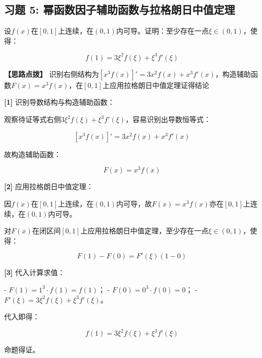 \documentclass[11pt,a4paper,UTF8]{ctexart}
\begin{document}
\subsection{习题 5: 幂函数因子辅助函数与拉格朗日中值定理}

设$f(x)$在$[0, 1]$上连续，在$(0, 1)$内可导。证明：至少存在一点$\xi \in (0, 1)$，使得：


\begin{equation*}
f(1) = 3\xi^2 f(\xi) + \xi^3 f'(\xi)
\end{equation*}

\textbf{\color{DeepPurple}【思路点拨】} 识别右侧结构为$[x^3 f(x)]' = 3x^2 f(x) + x^3 f'(x)$，构造辅助函数$F(x) = x^3 f(x)$，在$[0, 1]$上应用拉格朗日中值定理证得结论


\begin{solbox}[分步推导与答题规范]
\textbf{[1]} 识别导数结构与构造辅助函数：

观察待证等式右侧$3\xi^2 f(\xi) + \xi^3 f'(\xi)$，容易识别出导数恒等式：


\begin{equation*}
\left[x^3 f(x)\right]' = 3x^2 f(x) + x^3 f'(x)
\end{equation*}


故构造辅助函数：


\begin{equation*}
F(x) = x^3 f(x)
\end{equation*}


\textbf{[2]} 应用拉格朗日中值定理：

因$f(x)$在$[0, 1]$上连续，在$(0, 1)$内可导，故$F(x) = x^3 f(x)$亦在$[0, 1]$上连续，在$(0, 1)$内可导。

对$F(x)$在闭区间$[0, 1]$上应用拉格朗日中值定理，至少存在一点$\xi \in (0, 1)$，使得：


\begin{equation*}
F(1) - F(0) = F'(\xi)(1 - 0)
\end{equation*}


\textbf{[3]} 代入计算求值：

- $F(1) = 1^3 \cdot f(1) = f(1)$；
- $F(0) = 0^3 \cdot f(0) = 0$；
- $F'(\xi) = 3\xi^2 f(\xi) + \xi^3 f'(\xi)$。

代入即得：


\begin{equation*}
f(1) = 3\xi^2 f(\xi) + \xi^3 f'(\xi)
\end{equation*}


命题得证。
\end{solbox}
\end{document}
